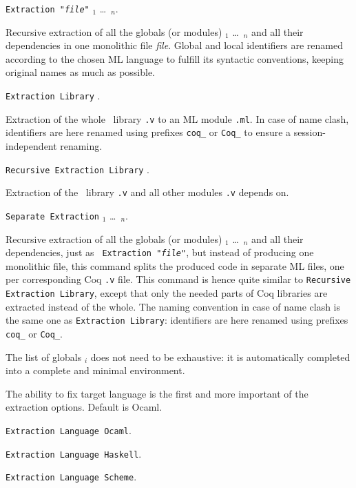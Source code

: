 \begin{description}
\item {\tt Extraction "{\em file}"}  
      \qualid$_1$ \dots\ \qualid$_n$. ~\par
  Recursive extraction of all the globals (or modules) \qualid$_1$ \dots\
  \qualid$_n$ and all their dependencies in one monolithic file {\em file}.
  Global and local identifiers are renamed according to the chosen ML
  language to fulfill its syntactic conventions, keeping original
  names as much as possible.
  
\item {\tt Extraction Library} \ident. ~\par 
  Extraction of the whole \Coq\ library {\tt\ident.v} to an ML module
  {\tt\ident.ml}.  In case of name clash, identifiers are here renamed
  using prefixes \verb!coq_!  or \verb!Coq_! to ensure a
  session-independent renaming.

\item {\tt Recursive Extraction Library} \ident. ~\par
  Extraction of the \Coq\ library {\tt\ident.v} and all other modules 
  {\tt\ident.v} depends on. 

\item {\tt Separate Extraction}
      \qualid$_1$ \dots\ \qualid$_n$. ~\par
  Recursive extraction of all the globals (or modules) \qualid$_1$ \dots\
  \qualid$_n$ and all their dependencies, just as {\tt
    Extraction "{\em file}"}, but instead of producing one monolithic
  file, this command splits the produced code in separate ML files, one per
  corresponding Coq {\tt .v} file. This command is hence quite similar
  to {\tt Recursive Extraction Library}, except that only the needed
  parts of Coq libraries are extracted instead of the whole. The
  naming convention in case of name clash is the same one as
  {\tt Extraction Library}: identifiers are here renamed
  using prefixes \verb!coq_!  or \verb!Coq_!.
\end{description}

\noindent The list of globals \qualid$_i$ does not need to be
exhaustive: it is automatically completed into a complete and minimal
environment. 



The ability to fix target language is the first and more important
of the extraction options. Default is Ocaml.
\begin{description}
\item {\tt Extraction Language Ocaml}.
\item {\tt Extraction Language Haskell}.
\item {\tt Extraction Language Scheme}.
\end{description}

